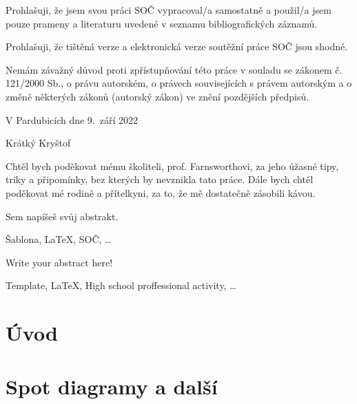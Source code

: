 \documentclass[12pt, a4paper,
 twoside,        %
 openright
]{report}
\newcommand\name{Krátký Kryštof}
\begin{document}
\noindent Prohlašuji, že jsem svou práci SOČ vypracoval/a samostatně a použil/a jsem pouze prameny a literaturu uvedené v seznamu bibliografických záznamů.

\noindent Prohlašuji, že tištěná verze a elektronická verze soutěžní práce SOČ jsou shodné. 

\noindent Nemám závažný důvod proti zpřístupňování této práce v souladu se zákonem č. 121/2000 Sb., o právu autorském, o právech souvisejících s právem autorským a o změně některých zákonů (autorský zákon) ve znění pozdějších předpisů. 

\vspace{24 pt}

\noindent V Pardubicích dne 9.\ září 2022 \dotfill{} 

\hspace{8cm} \name\cleardoublepage\vspace*{0.8\textheight}

\noindent
Chtěl bych poděkovat mému školiteli, prof. Farnsworthovi, za jeho úžasné tipy, triky a připomínky, bez kterých by nevznikla tato práce. Dále bych chtěl poděkovat mé rodině a přítelkyni, za to, že mě dostatečně zásobili kávou.

\cleardoublepage{}

\noindent Sem napíšeš svůj abstrakt. \lipsum[1] %

\vspace{18pt}


\noindent Šablona, \LaTeX, SOČ, \dots 

\vspace{18pt}


\noindent Write your abstract here! \lipsum[1] %

\vspace{18pt}


\noindent Template, \LaTeX, High school proffessional activity, \dots 

\cleardoublepage\tableofcontents

\pagestyle{fancy}
\setcounter{page}{1}

\chapter*{Úvod}

\chapter{%
Spot diagramy a další }
\end{document}
